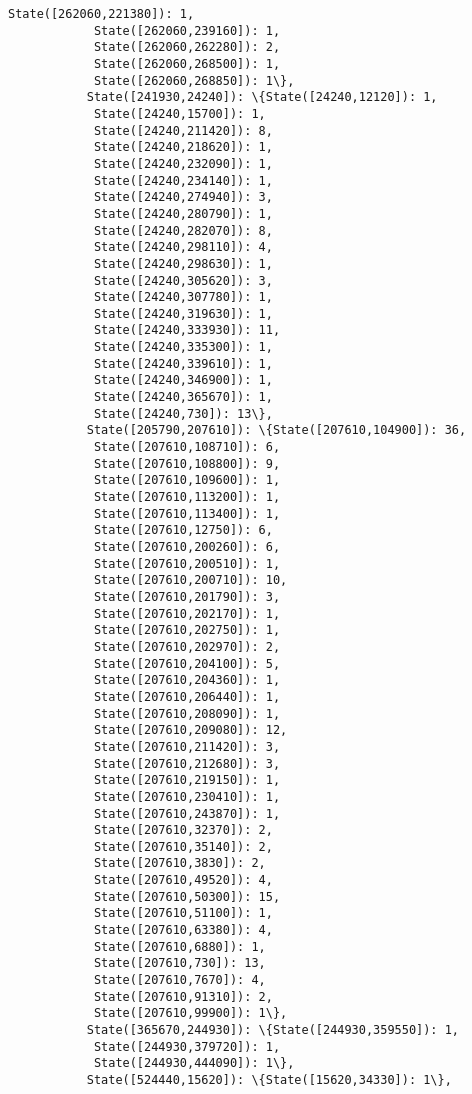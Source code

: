 \documentclass[11pt]{article}
\begin{document}
\begin{Verbatim}[commandchars=\\\{\}]
            State([262060,221380]): 1,
            State([262060,239160]): 1,
            State([262060,262280]): 2,
            State([262060,268500]): 1,
            State([262060,268850]): 1\},
           State([241930,24240]): \{State([24240,12120]): 1,
            State([24240,15700]): 1,
            State([24240,211420]): 8,
            State([24240,218620]): 1,
            State([24240,232090]): 1,
            State([24240,234140]): 1,
            State([24240,274940]): 3,
            State([24240,280790]): 1,
            State([24240,282070]): 8,
            State([24240,298110]): 4,
            State([24240,298630]): 1,
            State([24240,305620]): 3,
            State([24240,307780]): 1,
            State([24240,319630]): 1,
            State([24240,333930]): 11,
            State([24240,335300]): 1,
            State([24240,339610]): 1,
            State([24240,346900]): 1,
            State([24240,365670]): 1,
            State([24240,730]): 13\},
           State([205790,207610]): \{State([207610,104900]): 36,
            State([207610,108710]): 6,
            State([207610,108800]): 9,
            State([207610,109600]): 1,
            State([207610,113200]): 1,
            State([207610,113400]): 1,
            State([207610,12750]): 6,
            State([207610,200260]): 6,
            State([207610,200510]): 1,
            State([207610,200710]): 10,
            State([207610,201790]): 3,
            State([207610,202170]): 1,
            State([207610,202750]): 1,
            State([207610,202970]): 2,
            State([207610,204100]): 5,
            State([207610,204360]): 1,
            State([207610,206440]): 1,
            State([207610,208090]): 1,
            State([207610,209080]): 12,
            State([207610,211420]): 3,
            State([207610,212680]): 3,
            State([207610,219150]): 1,
            State([207610,230410]): 1,
            State([207610,243870]): 1,
            State([207610,32370]): 2,
            State([207610,35140]): 2,
            State([207610,3830]): 2,
            State([207610,49520]): 4,
            State([207610,50300]): 15,
            State([207610,51100]): 1,
            State([207610,63380]): 4,
            State([207610,6880]): 1,
            State([207610,730]): 13,
            State([207610,7670]): 4,
            State([207610,91310]): 2,
            State([207610,99900]): 1\},
           State([365670,244930]): \{State([244930,359550]): 1,
            State([244930,379720]): 1,
            State([244930,444090]): 1\},
           State([524440,15620]): \{State([15620,34330]): 1\},

\end{Verbatim}
\end{document}
